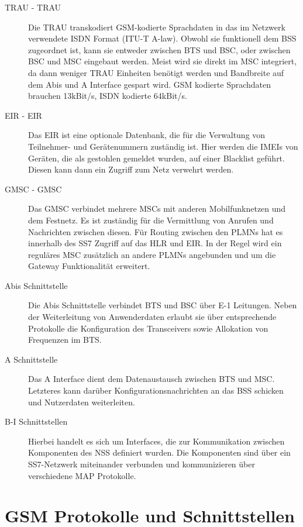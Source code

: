 \begin{description}
\item[\acs{TRAU} - \acl{TRAU}] Die \ac{TRAU} transkodiert \ac{GSM}-kodierte Sprachdaten in das im Netzwerk verwendete \ac{ISDN} Format (ITU-T A-law). Obwohl sie funktionell dem \ac{BSS} zugeordnet ist, kann sie entweder zwischen \ac{BTS} und \ac{BSC}, oder zwischen \ac{BSC} und \ac{MSC} eingebaut werden. Meist wird sie direkt im \ac{MSC} integriert, da dann weniger \ac{TRAU} Einheiten benötigt werden und Bandbreite auf dem Abis und A Interface gespart wird. \ac{GSM} kodierte Sprachdaten brauchen 13kBit/s, \ac{ISDN} kodierte 64kBit/s. \citep[Kap. 5.2.1]{eberspacher:2008:gsm-architecture}
\item[\acs{EIR} - \acl{EIR}] Das \ac{EIR} ist eine optionale Datenbank, die für die Verwaltung von Teilnehmer- und Gerätenummern zuständig ist. Hier werden die \acp{IMEI} von Geräten, die als gestohlen gemeldet wurden, auf einer Blacklist geführt. Diesen kann dann ein Zugriff zum Netz verwehrt werden.
\item[\acs{GMSC} - \acl{GMSC}] Das \ac{GMSC} verbindet mehrere \acp{MSC} mit anderen Mobilfunknetzen und dem Festnetz. Es ist zuständig für die Vermittlung von Anrufen und Nachrichten zwischen diesen. Für Routing zwischen den \acp{PLMN} hat es innerhalb des \ac{SS7} Zugriff auf das \ac{HLR} und \ac{EIR}. In der Regel wird ein reguläres \ac{MSC} zusätzlich an andere \acp{PLMN} angebunden und um die Gateway Funktionalität erweitert.
\item[Abis Schnittstelle]
Die Abis Schnittstelle verbindet \ac{BTS} und \ac{BSC} über E-1 Leitungen. Neben der Weiterleitung von Anwenderdaten erlaubt sie über entsprechende Protokolle die Konfiguration des Transceivers sowie Allokation von Frequenzen im \ac{BTS}.
\item[A Schnittstelle] Das A Interface dient dem Datenaustausch zwischen \ac{BTS} und \ac{MSC}. Letzteres kann darüber Konfigurationsnachrichten an das \ac{BSS} schicken und Nutzerdaten weiterleiten.
\item[B-I Schnittstellen]
Hierbei handelt es sich um Interfaces, die zur Kommunikation zwischen Komponenten des \ac{NSS} definiert wurden. Die Komponenten sind über ein \ac{SS7}-Netzwerk miteinander verbunden und kommunizieren über verschiedene \ac{MAP} Protokolle.
\end{description}

\section{GSM Protokolle und Schnittstellen} \label{hdl:a_schnittstellen_protokolle}

